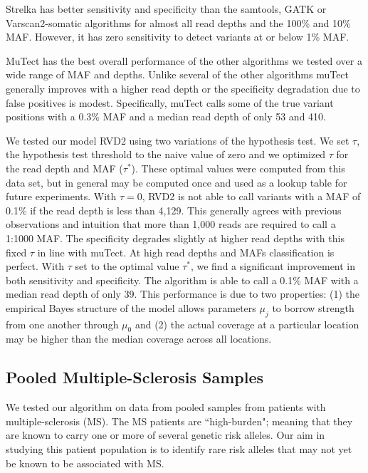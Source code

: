 \documentclass[11pt,reqno]{amsart}
\begin{document}
Strelka has better sensitivity and specificity than the samtools, GATK or Varscan2-somatic algorithms for almost all read depths and the 100\% and 10\% MAF. However, it has zero sensitivity to detect variants at or below 1\% MAF. 

MuTect has the best overall performance of the other algorithms we tested over a wide range of MAF and depths. Unlike several of the other algorithms muTect generally improves with a higher read depth or the specificity degradation due to false positives is modest. Specifically, muTect calls some of the true variant positions with a 0.3\% MAF and a median read depth of only 53 and 410.

We tested our model RVD2 using two variations of the hypothesis test. We set $\tau$, the hypothesis test threshold to the naive value of zero and we optimized $\tau$ for the read depth and MAF ($\tau^*$). These optimal values were computed from this data set, but in general may be computed once and used as a lookup table for future experiments. With $\tau=0$, RVD2 is not able to call variants with a MAF of 0.1\% if the read depth is less than 4,129. This generally agrees with previous observations and intuition that more than 1,000 reads are required to call a 1:1000 MAF. The specificity degrades slightly at higher read depths with this fixed $\tau$ in line with muTect. At high read depths and MAFs classification is perfect. With $\tau$ set to the optimal value $\tau^*$, we find a significant improvement in both sensitivity and specificity. The algorithm is able to call a 0.1\% MAF with a median read depth of only 39. This performance is due to two properties: (1) the empirical Bayes structure of the model allows parameters $\mu_j$ to borrow strength from one another through $\mu_0$ and (2) the actual coverage at a particular location may be higher than the median coverage across all locations.

\subsection{Pooled Multiple-Sclerosis Samples}\label{sec:ms}

We tested our algorithm on data from pooled samples from patients with multiple-sclerosis (MS). The MS patients are ``high-burden"; meaning that they are known to carry one or more of several genetic risk alleles. Our aim in studying this  patient population is to identify rare risk alleles that may not yet be known to be associated with MS. 
\end{document}
